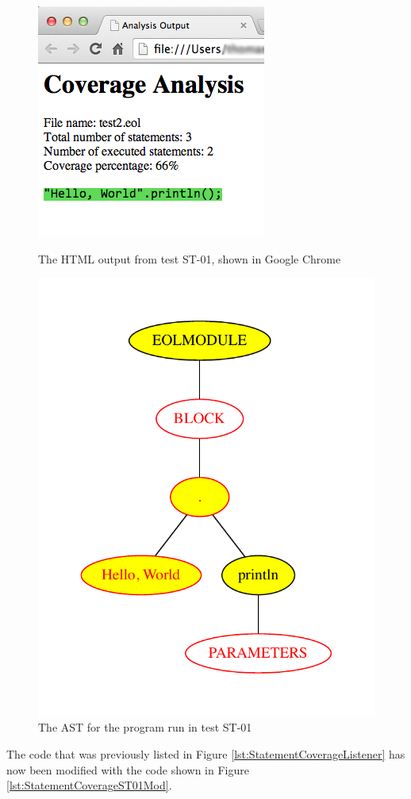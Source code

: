 \begin{figure}
\centering
\begin{minipage}{.5\textwidth}
  \centering
  \includegraphics[width=0.6\linewidth]{figures/ST01HTML.png}
  \caption{The HTML output from test ST-01, shown in Google Chrome}
  \label{fig:ST01HTML}
\end{minipage}%
\begin{minipage}{.5\textwidth}
  \centering
  \includegraphics[width=0.6\linewidth]{figures/ST01AST.pdf}
  \caption{The AST for the program run in test ST-01}
  \label{fig:ST01AST}
\end{minipage}
\end{figure}

The code that was previously listed in Figure \ref{lst:StatementCoverageListener} has now been modified with the code shown in Figure \ref{lst:StatementCoverageST01Mod}.

